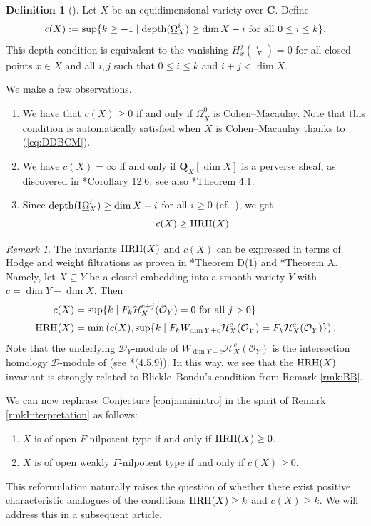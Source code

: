 \documentclass[letterpaper,11pt]{amsart}
\DeclareMathOperator{\DDB}{\underline{\Omega}}
\DeclareMathOperator{\IO}{I\hspace{0.07em}\underline{\Omega}}
\theoremstyle{plain}
\theoremstyle{definition}
\newtheorem{defi}[thm]{Definition}
\theoremstyle{remark}
\newtheorem{rmk}[thm]{Remark}
\def\Q{{\mathbf Q}}
\def\C{{\mathbf C}}
\def\cD{\mathcal{D}}
\def\cH{\mathcal{H}}
\def\cO{\mathcal{O}}
\begin{document}
\begin{defi}[{\cite{CDOIsolated}}] Let $X$ be an equidimensional variety over $\C$. Define
\[ c(X) := \sup \{k \geq -1 \mid {\rm depth}(\underline{\Omega}_X^i) \geq \dim X - i \text{ for all } 0 \leq i \leq k\}.\]
This depth condition is equivalent to the vanishing $H^j_x(\DDB_X^i) = 0$ for all closed points $x \in X$ and all   $i,j$ such that $0 \leq i \leq k$ and $i+j < \dim X$.
\end{defi}

We make a few observations.
\begin{enumerate}
\setlength\itemsep{0.3em}
    \item We have that $c(X) \geq 0$ if and only if $\underline{\Omega}_X^0$ is Cohen--Macaulay. Note that this condition is automatically satisfied when $X$ is Cohen--Macaulay thanks to (\ref{eq:DDBCM}).
    \item We have $c(X) = \infty$ if and only if $\Q_X[\dim X]$ is a perverse sheaf, as discovered in \cite{MPLocCoh}*{Corollary 12.6};  see also \cite{PSV}*{Theorem 4.1}.
    \item Since ${\rm depth}(\IO^i_X) \geq \dim X - i$ for all $i \geq 0$ (cf.\  \cite[Lemma 2.31]{KW}), we get
\[ c(X) \geq {\rm HRH}(X).\]
\end{enumerate}


\begin{rmk} \label{rmk:cHRHHodgeWeight}
The invariants ${\rm HRH}(X)$ and $c(X)$ can be expressed in terms of Hodge and weight filtrations as proven in \cite{DOR1}*{Theorem D(1)} and \cite{CDOIsolated}*{Theorem A}. Namely, let $X \subseteq Y$ be a closed embedding into a smooth variety $Y$ with $c = \dim Y - \dim X$. Then
\begin{align*} c(X) &= \sup \{k \mid F_k \cH^{c+j}_X(\cO_Y) = 0 \text{ for all } j > 0\}\\[0.3em]
{\rm HRH}(X) &= \min\left(c(X), \sup \{k \mid F_k W_{\dim Y +c}\cH^{c}_X(\cO_Y) = F_k \cH^c_X(\cO_Y)\}\right).
\end{align*}
Note that the underlying $\cD_Y$-module of $W_{\dim Y +c} \cH^c_X(\cO_Y)$ is the intersection homology $\cD$-module of \cite{BrylinskiKashiwara} (see \cite{SaitoMHM}*{(4.5.9)}). In this way, we see that the ${\rm HRH}(X)$ invariant is strongly related to Blickle--Bondu's condition from Remark \ref{rmk:BB}.
\end{rmk}

We can now rephrase Conjecture \ref{conj:mainintro} in the spirit of Remark \ref{rmkInterpretation} as follows:
{\setlength{\leftmargini}{2em} \begin{enumerate}
\setlength\itemsep{0.1em}
\item $X$ is of open $F$-nilpotent type if and only if ${\rm HRH}(X) \geq 0$.
\item $X$ is of open weakly $F$-nilpotent type if and only if $c(X) \geq 0$. 
\end{enumerate}}
This reformulation naturally raises the question of whether there exist positive characteristic analogues of the conditions ${\rm HRH}(X) \geq k$ and $c(X) \geq k$. We will address this in a subsequent article.
\end{document}
